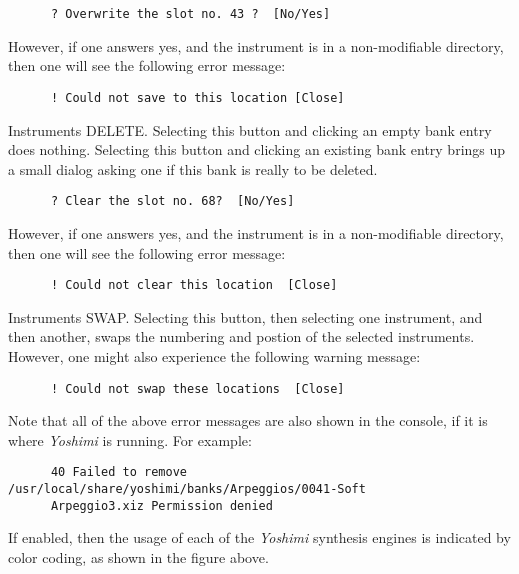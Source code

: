    \begin{verbatim}
      ? Overwrite the slot no. 43 ?  [No/Yes]
   \end{verbatim}

   However, if one answers yes, and the instrument is in a non-modifiable
   directory, then one will see the following error message:

   \begin{verbatim}
      ! Could not save to this location [Close]
   \end{verbatim}

   Instruments DELETE.
   Selecting this button and clicking an empty bank entry does nothing.
   Selecting this button and clicking an existing bank entry brings up a
   small dialog asking one if this bank is really to be deleted.

   \begin{verbatim}
      ? Clear the slot no. 68?  [No/Yes]
   \end{verbatim}

   However, if one answers yes, and the instrument is in a non-modifiable
   directory, then one will see the following error message:

   \begin{verbatim}
      ! Could not clear this location  [Close]
   \end{verbatim}

   Instruments SWAP.
   Selecting this button, then selecting one instrument, and then another,
   swaps the numbering and postion of the selected instruments.
   However, one might also experience the following warning message:

   \begin{verbatim}
      ! Could not swap these locations  [Close]
   \end{verbatim}

   Note that all of the above error messages are also shown in the console, if
   it is where \textsl{Yoshimi} is running.  For example:

   \begin{verbatim}
      40 Failed to remove /usr/local/share/yoshimi/banks/Arpeggios/0041-Soft
      Arpeggio3.xiz Permission denied
   \end{verbatim}

   If enabled, then the usage of each of the \textsl{Yoshimi} synthesis
   engines is indicated by color coding, as shown in the figure above.


